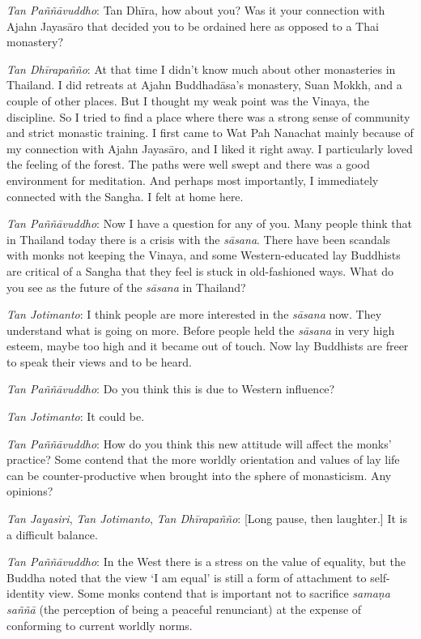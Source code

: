 \emph{Tan Paññāvuddho}: Tan Dhīra, how about you? Was it your
connection with Ajahn Jayasāro that decided you to be ordained here as
opposed to a Thai monastery? 

\emph{Tan Dhīrapañño}: At that time I didn't know much about other
monasteries in Thailand. I did retreats at Ajahn Buddhadāsa's monastery, 
Suan Mokkh, and a couple of other places. But I thought my weak point
was the Vinaya, the discipline. So I tried to find a place where there
was a strong sense of community and strict monastic training. I first
came to Wat Pah Nanachat mainly because of my connection with Ajahn
Jayasāro, and I liked it right away. I particularly loved the feeling of
the forest. The paths were well swept and there was a good environment
for meditation. And perhaps most importantly, I immediately connected
with the Sangha. I felt at home here. 

\emph{Tan Paññāvuddho}: Now I have a question for any of you. Many
people think that in Thailand today there is a crisis with the
\emph{sāsana}. There have been scandals with monks not keeping the
Vinaya, and some Western-educated lay Buddhists are critical of a Sangha
that they feel is stuck in old-fashioned ways. What do you see as the
future of the \emph{sāsana} in Thailand? 

\emph{Tan Jotimanto}: I think people are more interested in the
\emph{sāsana} now. They understand what is going on more. Before people
held the \emph{sāsana} in very high esteem, maybe too high and it became
out of touch. Now lay Buddhists are freer to speak their views and to be
heard. 

\emph{Tan Paññāvuddho}: Do you think this is due to Western influence? 

\emph{Tan Jotimanto}: It could be. 

\emph{Tan Paññāvuddho}: How do you think this new attitude will affect
the monks' practice? Some contend that the more worldly orientation and
values of lay life can be counter-productive when brought into the
sphere of monasticism. Any opinions? 

\emph{Tan Jayasiri}, \emph{Tan Jotimanto}, \emph{Tan Dhīrapañño}:
[Long pause, then laughter.] It is a difficult balance.

\emph{Tan Paññāvuddho}: In the West there is a stress on the value of
equality, but the Buddha noted that the view `I am equal' is still a
form of attachment to self-identity view. Some monks contend that is
important not to sacrifice \emph{samaṇa saññā} (the perception of being
a peaceful renunciant) at the expense of conforming to current worldly
norms. 

